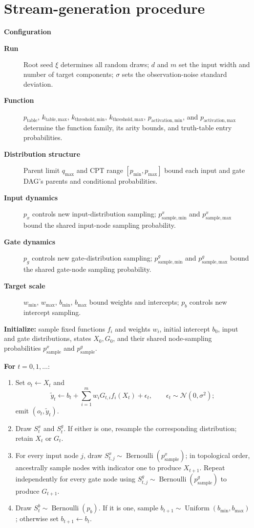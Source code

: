 \documentclass[11pt]{article}
\begin{document}
\section{Stream-generation procedure}
\noindent\textbf{Configuration}
\begin{description}
  \item[\textbf{Run}] Root seed $\xi$ determines all random draws; $d$ and
  $m$ set the input width and number of target components; $\sigma$ sets the
  observation-noise standard deviation.
  \item[\textbf{Function}] $p_{\mathrm{table}}$, $k_{\mathrm{table,max}}$,
  $k_{\mathrm{threshold,min}}$, $k_{\mathrm{threshold,max}}$,
  $p_{\mathrm{activation,min}}$, and $p_{\mathrm{activation,max}}$ determine
  the function family, its arity bounds, and truth-table entry probabilities.
  \item[\textbf{Distribution structure}] Parent limit $q_{\max}$ and CPT
  range $[p_{\min},p_{\max}]$ bound each input and gate DAG's parents and
  conditional probabilities.
  \item[\textbf{Input dynamics}] $p_x$ controls new input-distribution
  sampling; $p_{\mathrm{sample,min}}^x$ and
  $p_{\mathrm{sample,max}}^x$ bound the shared input-node sampling
  probability.
  \item[\textbf{Gate dynamics}] $p_g$ controls new gate-distribution sampling;
  $p_{\mathrm{sample,min}}^g$ and $p_{\mathrm{sample,max}}^g$ bound the
  shared gate-node sampling probability.
  \item[\textbf{Target scale}] $w_{\min}$, $w_{\max}$, $b_{\min}$,
  $b_{\max}$ bound weights and intercepts; $p_b$ controls new intercept
  sampling.
\end{description}

\noindent\textbf{Initialize:} sample fixed functions $f_i$ and weights $w_i$,
initial intercept $b_0$, input and gate distributions, states $X_0,G_0$, and
their shared node-sampling probabilities $p_{\mathrm{sample}}^x$ and
$p_{\mathrm{sample}}^g$.

\noindent\textbf{For} $t=0,1,\ldots$:
\begin{enumerate}
  \item Set $o_t\gets X_t$ and
  \[
    \tilde y_t\gets b_t+\sum_{i=1}^m w_iG_{t,i}f_i(X_t)+\epsilon_t,
    \qquad \epsilon_t\sim\mathcal N(0,\sigma^2);
  \]
  emit $(o_t,\tilde y_t)$.
  \item Draw $S_t^x$ and $S_t^g$.  If either is one, resample the
  corresponding distribution; retain $X_t$ or $G_t$.
  \item For every input node $j$, draw
  $S_{t,j}^x\sim\operatorname{Bernoulli}(p_{\mathrm{sample}}^x)$; in
  topological order, ancestrally sample nodes with indicator one to produce
  $X_{t+1}$.  Repeat independently
  for every gate node using
  $S_{t,j}^g\sim\operatorname{Bernoulli}(p_{\mathrm{sample}}^g)$ to produce
  $G_{t+1}$.
  \item Draw $S_t^b\sim
  \operatorname{Bernoulli}(p_b)$.  If it is one,
  sample $b_{t+1}\sim\operatorname{Uniform}(b_{\min},b_{\max})$; otherwise
  set $b_{t+1}\gets b_t$.
\end{enumerate}
\end{document}
